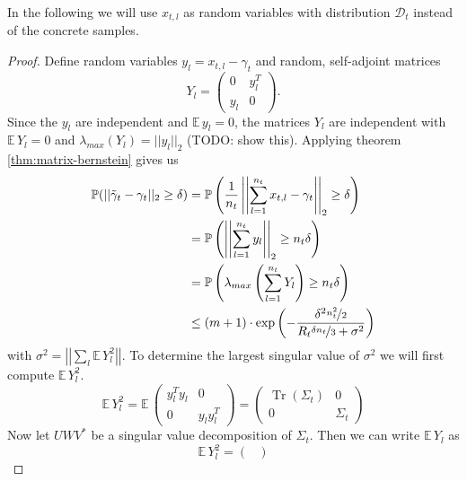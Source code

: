 \documentclass[10pt,a4paper]{article}
\DeclareMathOperator{\Tr}{Tr}
\begin{document}
In the following we will use $x_{t, l}$ as random variables with distribution $\mathcal{D}_{t}$ instead of the concrete samples.
\begin{proof}
  Define random variables $y_{l} = x_{t, l} - \gamma_{t}$ and random, self-adjoint matrices
  \begin{equation*}
    Y_{l} = \begin{pmatrix}
      0 & y_{l}^{T}\\
      y_{l} & 0
    \end{pmatrix}.
  \end{equation*}
  Since the $y_{l}$ are independent and $\mathbb{E}\,y_{l} = 0$, the matrices $Y_{l}$ are independent with $\mathbb{E}\,Y_{l} = 0$ and $\lambda_{max}(Y_{l}) = ||y_{l}||_{2}$ (TODO: show this).
  Applying theorem \ref{thm:matrix-bernstein} gives us
  \begin{align*}
    \mathbb{P}(||\tilde{\gamma}_{t} - \gamma_{t}||_{2} \ge \delta) & = \mathbb{P}\left( \frac{1}{n_{t}} \left|\left| \sum_{l = 1}^{n_{t}} x_{t, l} - \gamma_{t} \right|\right|_{2} \ge \delta \right)\\
    & = \mathbb{P}\left( \left|\left| \sum_{l = 1}^{n_{t}} y_{l} \right|\right|_{2} \ge n_{t}\delta \right)\\
    & = \mathbb{P}\left( \lambda_{max}\left( \sum_{l = 1}^{n_{t}} Y_{l} \right) \ge n_{t}\delta \right)\\
    & \le (m + 1) \cdot \exp\left( -\frac{\delta^{2} \nicefrac{n_{t}^{2}}{2}}{R_{t} \nicefrac{\delta n_{t}}{3} + \sigma^{2}} \right)
  \end{align*}
  with $\sigma^{2} = \left|\left| \sum_{l} \mathbb{E}\, Y_{l}^{2} \right|\right|$.
  To determine the largest singular value of $\sigma^{2}$ we will first compute $\mathbb{E}\,Y_{l}^{2}$.
  \begin{equation*}
    \mathbb{E}\,Y_{l}^{2} = \mathbb{E}\,\begin{pmatrix}
      y_{l}^{T}y_{l} & 0\\
      0 & y_{l}y_{l}^{T}
    \end{pmatrix}
    = \begin{pmatrix}
      \Tr(\Sigma_{t}) & 0\\
      0 & \Sigma_{t}
    \end{pmatrix}
  \end{equation*}
  Now let $UWV^{*}$ be a singular value decomposition of $\Sigma_{t}$.
  Then we can write $\mathbb{E}\,Y_{l}$ as
  \begin{equation*}
    \mathbb{E}\,Y_{l}^{2} = \begin{pmatrix}

\end{pmatrix}
\end{equation*}
\end{proof}
\end{document}
